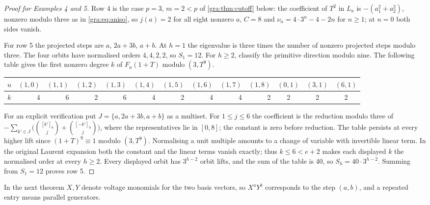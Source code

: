 \begin{proof}[Proof for Examples 4 and 5]
Row 4 is the case $p=3$, $m=2<p$ of \cref{gra:thm:cutoff} below: the
coefficient of $T^2$ in $L_a$ is $-(a_1^2+a_2^2)$, nonzero modulo three as in
\cref{gra:eq:aniso}, so $j(a)=2$ for all eight nonzero $a$, $C=8$ and
$\nu_n=4\cdot3^n-4-2n$ for $n\ge1$; at $n=0$ both sides vanish.

For row 5 the projected steps are $a$, $2a+3b$, $a+b$. At $h=1$ the
eigenvalue is three times the number of nonzero projected steps modulo
three. The four orbits have normalised orders $4,4,2,2$, so $S_1=12$. For
$h\ge2$, classify the primitive direction modulo nine. The following table
gives the first nonzero degree $k$ of $F_u(1+T)$ modulo $(3,T^9)$.
\begin{center}\small\upshape
\begin{tabular}{c|rrrrrrrrr|ccc}
$u$ & $(1,0)$ & $(1,1)$ & $(1,2)$ & $(1,3)$ & $(1,4)$ & $(1,5)$ &
$(1,6)$ & $(1,7)$ & $(1,8)$ & $(0,1)$ & $(3,1)$ & $(6,1)$\\
\hline
$k$&4&6&2&6&4&2&4&4&2&2&2&2
\end{tabular}
\end{center}
For an explicit verification put $J=\{a,2a+3b,a+b\}$ as a multiset. For
$1\le j\le6$ the coefficient is the reduction modulo three of
$-\sum_{k'\in J}\bigl(\binom{[k']_9}{j}+\binom{[-k']_9}{j}\bigr)$, where
the representatives lie in $[0,8]$; the constant is zero before reduction.
The table persists at every higher lift since $(1+T)^9\equiv1$ modulo
$(3,T^9)$. Normalising a unit multiple amounts to a change of variable with
invertible linear term. In the original Laurent expansion both the
constant and the linear terms vanish exactly; thus $k\le6<e+2$ makes each
displayed $k$ the normalised order at every $h\ge2$. Every displayed orbit
has $3^{h-2}$ orbit lifts, and the sum of the table is $40$, so
$S_h=40\cdot3^{h-2}$. Summing from $S_1=12$ proves row 5.
\end{proof}

In the next theorem $X,Y$ denote voltage monomials for the two basis
vectors, so $X^aY^b$ corresponds to the step $(a,b)$, and a repeated entry
means parallel generators.

